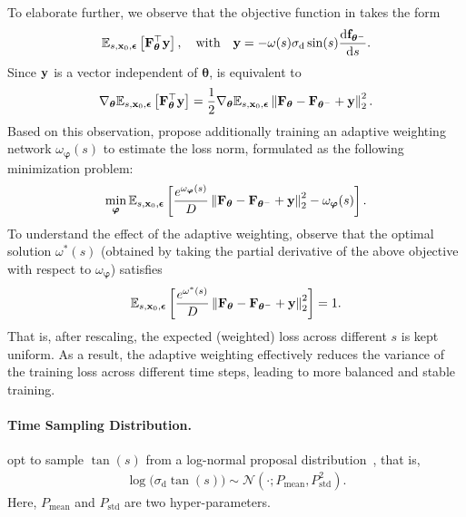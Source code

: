 To elaborate further, we observe that the objective function in  takes the form 
\[
\mathbb{E}_{s, {\mathbf{x}}_0, \bm{\epsilon}} \left[{\mathbf{F}}_{\bm{\theta}}^\top {\mathbf{y}} \right],\quad\text{with}\quad {\mathbf{y}}=-\omega(s) \sigma_{\mathrm{d}} \sin(s)\frac{\mathop{}\!\mathrm{d} {\mathbf{f}}_{\bm{\theta}^-}}{\mathop{}\!\mathrm{d} s}.
\]
Since ${\mathbf{y}}$ is a vector independent of $\bm{\theta}$,  is equivalent to
\begin{align*}
    \nabla_{\bm{\theta}} \mathbb{E}_{s, {\mathbf{x}}_0, \bm{\epsilon}} \left[{\mathbf{F}}_{\bm{\theta}}^\top {\mathbf{y}} \right]
    = \frac{1}{2} \nabla_{\bm{\theta}} \mathbb{E}_{s, {\mathbf{x}}_0, \bm{\epsilon}} \left\| {\mathbf{F}}_{\bm{\theta}} - {\mathbf{F}}_{\bm{\theta}^-} + {\mathbf{y}} \right\|_2^2.
\end{align*}
Based on this observation, \citet{lu2024simplifying} propose additionally training an adaptive weighting network $\omega_{\bm{\varphi}}(s)$ to estimate the loss norm, formulated as the following minimization problem:
\begin{align*}
    \min_{\bm{\varphi}} \mathbb{E}_{s, {\mathbf{x}}_0, \bm{\epsilon}} \left[ \frac{e^{\omega_{\bm{\varphi}}(s)}}{D} \left\| {\mathbf{F}}_{\bm{\theta}} - {\mathbf{F}}_{\bm{\theta}^-} + {\mathbf{y}} \right\|_2^2 - \omega_{\bm{\varphi}}(s) \right].
\end{align*}
To understand the effect of the adaptive weighting, observe that the optimal solution $\omega^*(s)$ (obtained by taking the partial derivative of the above objective with respect to $\omega_{\bm{\varphi}}$) satisfies
\begin{align}\label{eq:effect-adaptive-wgt}
    \mathbb{E}_{s, {\mathbf{x}}_0, \bm{\epsilon}} \left[ \frac{e^{\omega^*(s)}}{D} \left\| {\mathbf{F}}_{\bm{\theta}} - {\mathbf{F}}_{\bm{\theta}^-} + {\mathbf{y}} \right\|_2^2 \right] = 1.
\end{align}
That is, after rescaling, the expected (weighted) loss across different $s$ is kept uniform. As a result, the adaptive weighting effectively reduces the variance of the training loss across different time steps, leading to more balanced and stable training.

\paragraph{Time Sampling Distribution.} \citet{lu2024simplifying} opt to sample $\tan(s)$ from a log-normal proposal distribution~\citep{karras2022elucidating}, that is,
\begin{align}\label{eq:s-dist}
    \log\big(\sigma_{\mathrm{d}} \tan(s)\big) \sim \mathcal{N}(\cdot;P_{\text{mean}}, P_{\text{std}}^2).
\end{align}
Here, $P_{\text{mean}}$ and $P_{\text{std}}$ are two hyper-parameters.


